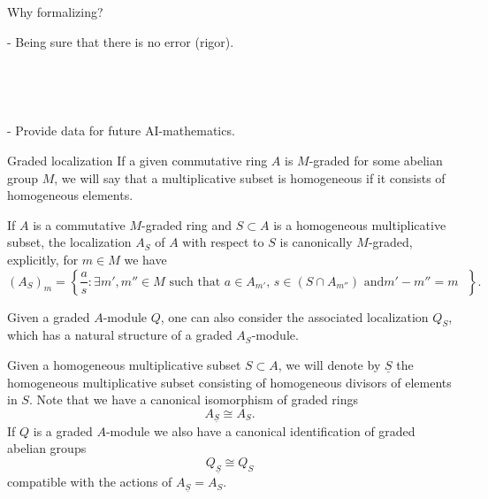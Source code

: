 \documentclass[9pt]{beamer}
\begin{document}
\begin{frame}{Why formalizing? }

- Being sure that there is no error (rigor).

$~~$

$~~$

- Provide data for future AI-mathematics.




\end{frame}


\begin{frame}{Graded localization}
If a given commutative ring $A$ is $M$-graded for some abelian group $M$, we will say that a multiplicative subset is homogeneous if it consists of homogeneous elements. 

If $A$ is a commutative $M$-graded ring and $S \subset A$ is a homogeneous multiplicative subset, the localization $A_S$ of $A$ with respect to $S$ is canonically $M$-graded, explicitly, for $m \in M$ we have
\[
( A_S)_m =  \left\{ \frac{a}{s} : \exists m', m'' \in M \text{ such that }  a \in A_{m'}, \, s \in (S \cap A_{m''}) \text{ and
$m'-m'' =m$ }\right\}.
\]


Given a graded $A$-module $Q$, one can also consider the associated localization $Q_S$, which has a natural structure of a graded $A_S$-module.

\end{frame}

\begin{frame}

Given a homogeneous multiplicative subset $S \subset A$, we will denote by $\underline{S}$ the homogeneous multiplicative subset consisting of homogeneous divisors of elements in $S$. Note that we have a canonical isomorphism of graded rings
\begin{equation}
\label{eqn:isom-localizations}
 A_{ \underline{S}} \cong A_{S}.
\end{equation}
If $Q$ is a graded $A$-module we also have a canonical identification of graded abelian groups 
\begin{equation}
\label{eqn:isom-localizations-modules}
Q_{\underline{S}} \cong Q_S
\end{equation}
compatible with the actions of $A_{ \underline{S}} = A_{S}$.

\end{frame}
\end{document}
